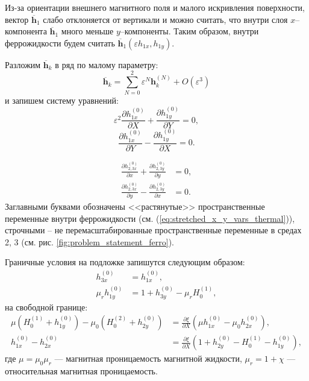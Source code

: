 \documentclass[12pt,a4paper]{article}
\begin{document}
Из-за ориентации внешнего магнитного
поля и малого искривления поверхности, вектор $\overline{\mathbf{h}}_1$
слабо отклоняется от вертикали и можно считать, что внутри слоя
$x$--компонента $\overline{\mathbf{h}}_1$ много меньше
$y$--компоненты. Таким образом, внутри феррожидкости будем считать
$\overline{\mathbf{h}}_1(\varepsilon h_{1x},h_{1y})$.

Разложим $\overline{\mathbf{h}}_k$ в ряд по малому параметру:
\[
\overline{\mathbf{h}}_k =
\sum_{N=0}^{2} \varepsilon^N \mathbf{h}_k^{(N)}
+ O(\varepsilon^3)
\]
и запишем систему уравнений:
\[
\varepsilon^2
\frac{\partial h_{1x}^{(0)}}{\partial X}
+
\frac{\partial h_{1y}^{(0)}}{\partial Y}
=0,
\]
\[
\frac{\partial h_{1x}^{(0)}}{\partial Y}
-
\frac{\partial h_{1y}^{(0)}}{\partial X}
=0.
\]

\begin{align*}
	\frac{\partial h_{2,3x}^{(0)}}{\partial x} + \frac{\partial h_{2,3y}^{(0)}}{\partial y} &= 0, \\
	\frac{\partial h_{2,3x}^{(0)}}{\partial y} - \frac{\partial h_{2,3y}^{(0)}}{\partial x} &= 0.
\end{align*}
Заглавными буквами обозначены <<растянутые>> пространственные переменные внутри феррожидкости (см. (\ref{eq:stretched_x_y_vars_thermal})), строчными -- не перемасштабированные пространственные переменные в средах 2, 3 (см. рис.  \ref{fig:problem_statement_ferro}). 

Граничные условия на подложке запишутся следующим образом:
\begin{align*}
	h_{3x}^{(0)} &= h_{1x}^{(0)}, \\
	\mu_r h_{1y}^{(0)} &= 1 + h_{3y}^{(0)} - \mu_r H_0^{(1)},
\end{align*}
на свободной границе:
\begin{align*}
	\mu \left( H_0^{(1)} + h_{1y}^{(0)} \right) - \mu_0 \left( H_0^{(2)} + h_{2y}^{(0)} \right) &= \frac{\partial \xi}{\partial X} \left( \mu h_{1x}^{(0)} - \mu_0 h_{2x}^{(0)} \right), \\
	h_{1x}^{(0)} - h_{2x}^{(0)} &= \frac{\partial \xi}{\partial X} \left( 1 + h_{2y}^{(0)} - H_0^{(1)} - h_{1y}^{(0)} \right),
\end{align*}
где $\mu = \mu_0 \mu_r$ — магнитная проницаемость магнитной жидкости, $\mu_r = 1 + \chi$ — относительная магнитная проницаемость.
\end{document}

